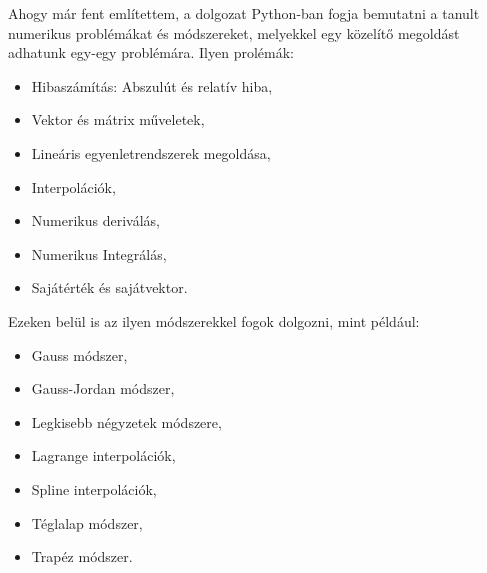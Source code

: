 
Ahogy már fent említettem, a dolgozat Python-ban fogja bemutatni a
tanult numerikus problémákat és módszereket, melyekkel egy közelítő
megoldást adhatunk egy-egy problémára. Ilyen prolémák:
\begin{itemize}
\item
  Hibaszámítás: Abszulút és relatív hiba,
\item
  Vektor és mátrix műveletek,
\item
  Lineáris egyenletrendszerek megoldása,
\item
  Interpolációk,
\item
  Numerikus deriválás,
\item
  Numerikus Integrálás,
\item
  Sajátérték és sajátvektor.
\end{itemize}
Ezeken belül is az ilyen módszerekkel fogok dolgozni, mint például:
\begin{itemize}
\item
  Gauss módszer,
\item
  Gauss-Jordan módszer,
\item
  Legkisebb négyzetek módszere,
\item
  Lagrange interpolációk,
\item
  Spline interpolációk,
\item
  Téglalap módszer,
\item
  Trapéz módszer.
\end{itemize}

